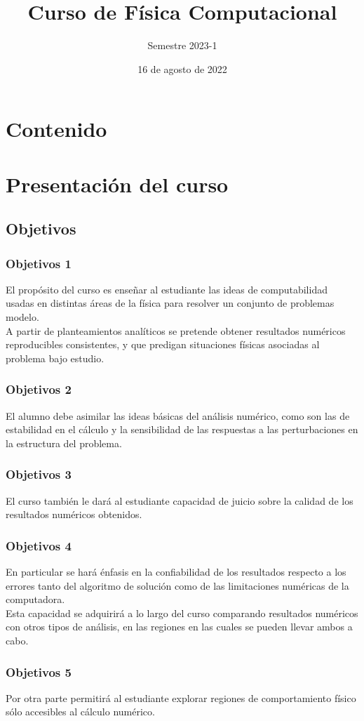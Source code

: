 \documentclass[12pt]{beamer}
\date{16 de agosto de 2022}
\title{Curso de Física Computacional}
\subtitle{Semestre 2023-1}
\begin{document}
\fontsize{14}{14}\selectfont
{}
\maketitle

\section*{Contenido}

\section{Presentación del curso}
\subsection{Objetivos}
\begin{frame}
\frametitle{Objetivos 1}
El propósito del curso es enseñar al estudiante las ideas de computabilidad usadas en distintas áreas de la  física para resolver un conjunto de problemas modelo. 
\\
\bigskip
\pause
A partir de planteamientos analíticos se pretende obtener resultados numéricos reproducibles consistentes, y que predigan situaciones físicas asociadas al problema bajo estudio.
\end{frame}
\begin{frame}
\frametitle{Objetivos 2}
El alumno debe asimilar las ideas básicas del análisis numérico, como son las de estabilidad en el cálculo y la sensibilidad de las respuestas a las perturbaciones en la estructura del problema.
\end{frame}
\begin{frame}
\frametitle{Objetivos 3}
El curso también le dará al estudiante capacidad de juicio sobre la calidad de los resultados numéricos obtenidos.
\end{frame}
\begin{frame}
\frametitle{Objetivos 4}
En particular se hará énfasis en la confiabilidad de los resultados respecto a los errores tanto del algoritmo de solución como de las limitaciones numéricas de la computadora. 
\\
\bigskip
\pause
Esta capacidad se adquirirá a lo largo del curso comparando resultados numéricos con otros tipos de análisis, en las regiones en las cuales se pueden llevar ambos a cabo.
\end{frame}
\begin{frame}
\frametitle{Objetivos 5}
 Por otra parte permitirá al estudiante explorar regiones de comportamiento físico sólo accesibles al cálculo numérico.
\end{frame}
\end{document}
